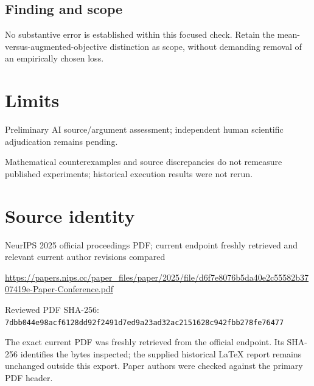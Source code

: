 \documentclass[11pt]{article}
\begin{document}
\subsection*{Finding and scope}

No substantive error is established within this focused check. Retain the mean-versus-augmented-objective distinction as scope, without demanding removal of an empirically chosen loss.

\section*{Limits}

Preliminary AI source/argument assessment; independent human scientific adjudication remains pending.\par

Mathematical counterexamples and source discrepancies do not remeasure published experiments; historical execution results were not rerun.\par

\section*{Source identity}

NeurIPS 2025 official proceedings PDF; current endpoint freshly retrieved and relevant current author revisions compared

\url{https://papers.nips.cc/paper_files/paper/2025/file/d6f7e8076b5da40e2c55582b3707419e-Paper-Conference.pdf}

Reviewed PDF SHA-256: \nolinkurl{7dbb044e98acf6128dd92f2491d7ed9a23ad32ac2151628c942fbb278fe76477}

The exact current PDF was freshly retrieved from the official endpoint. Its SHA-256 identifies the bytes inspected; the supplied historical LaTeX report remains unchanged outside this export. Paper authors were checked against the primary PDF header.
\end{document}
